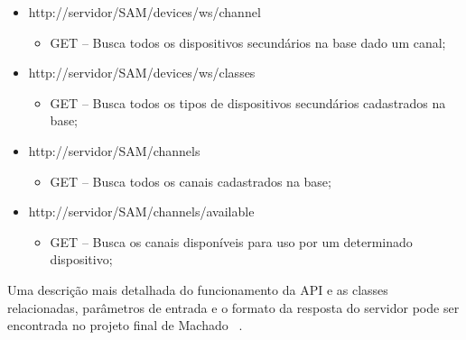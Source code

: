 \begin{itemize}
\begin{itemize}
\end{itemize}
\item http://servidor/SAM/devices/ws/channel
\begin{itemize}
	\item GET -- Busca todos os dispositivos secundários na base dado um canal;
\end{itemize}
\item http://servidor/SAM/devices/ws/classes
\begin{itemize}
	\item GET -- Busca todos os tipos de dispositivos secundários cadastrados na base;
\end{itemize}
\item http://servidor/SAM/channels
\begin{itemize}
	\item GET -- Busca todos os canais cadastrados na base;
\end{itemize}
\item http://servidor/SAM/channels/available
\begin{itemize}
	\item GET -- Busca os canais disponíveis para uso por um determinado dispositivo;
\end{itemize}
\end{itemize}

Uma descrição mais detalhada do funcionamento da API e as classes relacionadas, parâmetros de entrada e o formato da resposta do servidor pode ser encontrada no projeto final de Machado ~\cite{tccmarcelo}.
